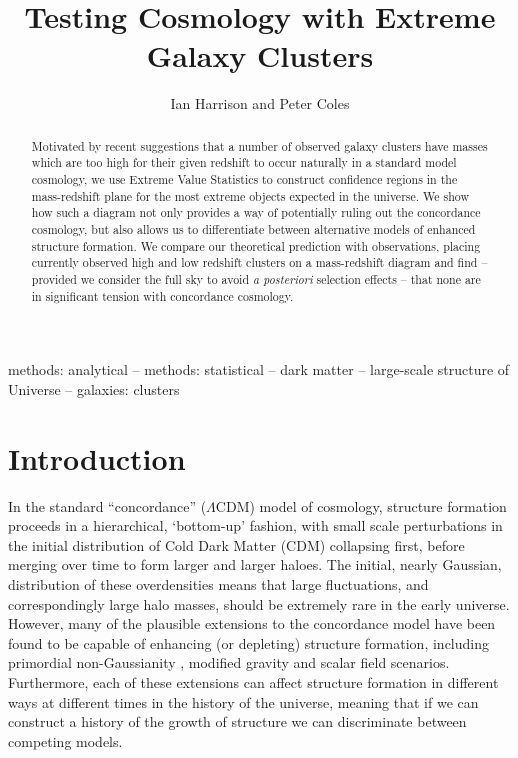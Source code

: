 \documentclass[twocolumn,useAMS,usenatbib,usegraphicx]{mn2e}
\title{Testing Cosmology with Extreme Galaxy Clusters}
\author[Harrison \& Coles]{Ian Harrison and Peter Coles \\ \cardiff}
\begin{document}
\maketitle
\begin{abstract}
Motivated by recent suggestions that a number of observed galaxy
clusters have masses which are too high for their given redshift to
occur naturally in a standard model cosmology, we use Extreme Value
Statistics to construct confidence regions in the mass-redshift
plane for the most extreme objects expected in the universe. We show
how such a diagram not only provides a way of potentially ruling out
the concordance cosmology, but also allows us to differentiate
between alternative models of enhanced structure formation. We
compare our theoretical prediction with observations, placing
currently observed high and low redshift clusters on a mass-redshift
diagram and find -- provided we consider the full sky to avoid
\textit{a posteriori} selection effects -- that none are in
significant tension with concordance cosmology.
\end{abstract}
\begin{keywords}
methods: analytical -- methods: statistical -- dark matter -- large-scale structure of Universe -- galaxies: clusters
\end{keywords}

\section{Introduction}
In the standard ``concordance'' ($\Lambda$CDM) model of cosmology, structure
formation proceeds in a hierarchical, `bottom-up' fashion, with
small scale perturbations in the initial distribution of Cold Dark
Matter (CDM) collapsing first, before merging over time to form
larger and larger haloes. The initial, nearly Gaussian,
distribution of these overdensities means that large fluctuations,
and correspondingly large halo masses, should be extremely rare in
the early universe. However, many of the plausible extensions to the
concordance model have been found to be capable of enhancing (or
depleting) structure formation, including primordial non-Gaussianity
\citep{Matarrese2000, Pillepich2010a}, modified gravity
\citep{Schmidt2009, Ferraro2011} and scalar field \citep{Baldi2011c,
Li2011, Mortonson2011, Tarrant2011} scenarios. Furthermore, each of
these extensions can affect structure formation in different ways at
different times in the history of the universe, meaning that if we
can construct a history of the growth of structure we can
discriminate between competing models.
\end{document}
